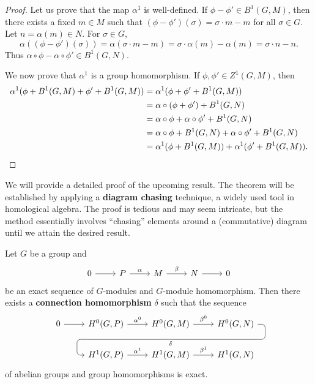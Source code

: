 \begin{proof}
    Let us prove that the map $\alpha^1$ is well-defined. If 
    $\phi-\phi'\in B^1(G,M)$, then 
    there exists a fixed 
    $m\in M$ such that 
    $(\phi-\phi')(\sigma)=\sigma\cdot m-m$ for all $\sigma\in G$. 
    Let $n=\alpha(m)\in N$. 
    For $\sigma\in G$, 
    \[
    \alpha((\phi-\phi')(\sigma))=\alpha(\sigma\cdot m-m)
    =\sigma\cdot \alpha(m)-\alpha(m)=\sigma\cdot n-n. 
    \]
    Thus $\alpha\circ\phi-\alpha\circ\phi'\in B^1(G,N)$. 

    We now prove that $\alpha^1$ is a group homomorphism. If 
    $\phi,\phi'\in Z^1(G,M)$, then 
    \begin{align*}
    \alpha^1(\phi+B^1(G,M)+\phi'+B^1(G,M))
    &=\alpha^1(\phi+\phi'+B^1(G,M))\\
    &=\alpha\circ(\phi+\phi')+B^1(G,N)\\
    &=\alpha\circ\phi+\alpha\circ\phi'+B^1(G,N)\\
    &=\alpha\circ\phi+B^1(G,N)+\alpha\circ\phi'+B^1(G,N)\\
    &=\alpha^1(\phi+B^1(G,M))+\alpha^1(\phi'+B^1(G,M)).\qedhere
    \end{align*}
\end{proof}

We will provide a detailed proof of the upcoming result. 
The theorem will be established by applying a \textbf{diagram chasing} technique, a widely used tool in homological algebra.
The proof is tedious and may seem intricate, but the method essentially 
involves ``chasing'' elements around a (commutative) diagram until we attain the desired result. 

\begin{theorem}
Let $G$ be a group and 
\[
\begin{tikzcd}
    0 & P & M & N & 0
    \arrow[from=1-1, to=1-2]
    \arrow["\alpha", from=1-2, to=1-3]
    \arrow["\beta", from=1-3, to=1-4]
    \arrow[from=1-4, to=1-5]
    \end{tikzcd}
\] 
be an exact sequence of $G$-modules and $G$-module homomorphism. 
Then there exists a \textbf{connection homomorphism} $\delta$ such that the sequence 
\begin{equation}
\label{eq:long}
\begin{tikzcd}
 0\rar & H^0(G,P)\rar["\alpha^0"] & H^0(G,M) \rar["\beta^0"]
             \ar[draw=none]{d}[name=X, anchor=center]{}
    & H^0(G,N) \ar[rounded corners,
            to path={ -- ([xshift=2ex]\tikztostart.east)
                      |- (X.center) \tikztonodes
                      -| ([xshift=-2ex]\tikztotarget.west)
                      -- (\tikztotarget)}]{dll}[at end]{\delta} \\      
  &H^1(G,P) \rar["\alpha^1"] & H^1(G,M) \rar["\beta^1"] & H^1(G,N)
\end{tikzcd}
\end{equation}
of abelian groups
and group homomorphisms is exact. 
\end{theorem}

